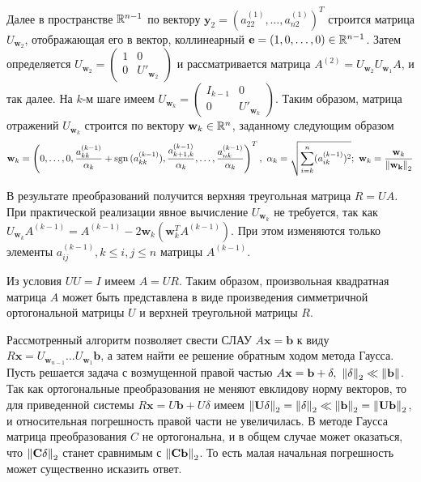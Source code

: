 Далее в пространстве $\mathbb{R}^{n-1}$ по вектору $\mathbf{y}_2=(a^{(1)}_{22},\ldots,a^{(1)}_{n2})^T$ строится матрица
$U_{\mathbf{w}_2}$, отображающая его в вектор, коллинеарный $\mathbf{e}=(1,0,\ldots,0)\in \mathbb{R}^{n-1}$.
Затем определяется $U_{\mathbf{w}_2}=\left(\begin{array}{cc}1 & 0 \\ 0 & U'_{\mathbf{w}_2}\end{array}\right)$
и рассматривается матрица $A^{(2)}=U_{\mathbf{w}_2}U_{\mathbf{w}_1}A$,
и так далее. На $k$-м шаге имеем $U_{\mathbf{w}_k}=\left(\begin{array}{cc}
      I_{k-1} & 0                 \\
      0       & U'_{\mathbf{w}_k}
    \end{array}\right)$. Таким образом, матрица отражений $U_{\mathbf{w}_k}$ строится
по вектору $\mathbf{w}_k\in\mathbb{R}^n$, заданному следующим образом
\[\mathbf{w}_k=\left(0,\ldots,0,\frac{a^{(k-1)}_{kk}}{\alpha_k} + \sgn{(a^{(k-1)}_{kk})}, \frac{a^{(k-1)}_{k+1,k}}{\alpha_k},\ldots,\frac{a^{(k-1)}_{nk}}{\alpha_k}\right)^T,\ \alpha_k =\sqrt{\sum_{i=k}^n(a^{(k-1)}_{ik})^2};\ \mathbf{w}_k = \frac{\mathbf{w}_k}{\norml{\mathbf{w}_k}{2}}\]

В результате преобразований получится верхняя треугольная матрица $R=UA$.
При практической реализации явное вычисление
$U_{\mathbf{w}_k}$ не требуется, так как $U_{\mathbf{w}_k}A^{(k-1)}=A^{(k-1)}-2\mathbf{w}_k(\mathbf{w}_k^TA^{(k-1)})$.
При этом изменяются только элементы $a^{(k-1)}_{ij}, k \leq i,j \leq n$ матрицы $A^{(k-1)}$.

Из условия $UU=I$ имеем $A=UR$. Таким образом, произвольная квадратная
матрица $A$ может быть представлена в виде произведения симметричной
ортогональной матрицы $U$ и верхней треугольной матрицы $R$.

Рассмотренный алгоритм позволяет свести СЛАУ
$A\mathbf{x} = \mathbf{b}$ к виду $R\mathbf{x} = U_{\mathbf{w}_{n-1}}\ldots U_{\mathbf{w}_1}\mathbf{b}$,
а затем найти ее решение обратным ходом метода Гаусса.
Пусть решается задача с возмущенной правой частью
$A\mathbf{x}=\mathbf{b}+\delta,\ \norml{\delta}{2}\ll \norm{\mathbf{b}}$. Так как ортогональные
преобразования не меняют евклидову норму
векторов, то для приведенной системы $R\mathbf{x} = U\mathbf{b}+U\delta$
имеем $\left\lVert\mathbf{U\delta}\right\rVert_{2} = \left\lVert\mathbf{\delta}\right\rVert_{2} \ll \left\lVert\mathbf{\mathbf{b}}\right\rVert_{2} = \left\lVert\mathbf{U\mathbf{b}}\right\rVert_{2}$,
и относительная погрешность правой части не увеличилась. В методе
Гаусса матрица преобразования $C$ не ортогональна,
и в общем случае может оказаться, что $\left\lVert\mathbf{C\delta}\right\rVert_{2}$ станет сравнимым с
$\left\lVert\mathbf{C\mathbf{b}}\right\rVert_{2}$. То есть малая начальная погрешность может существенно исказить
ответ.

